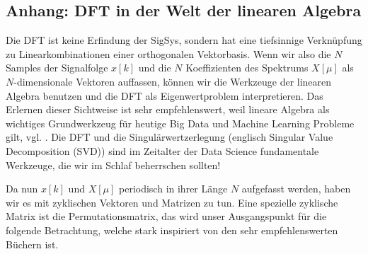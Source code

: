 
















































\clearpage
\subsection*{Anhang: DFT in der Welt der linearen Algebra}
%
Die DFT ist keine Erfindung der SigSys, sondern hat eine
tiefsinnige Verknüpfung zu Linearkombinationen einer orthogonalen
Vektorbasis.
%
Wenn wir also die $N$ Samples der Signalfolge $x[k]$ und die $N$ Koeffizienten des Spektrums $X[\mu]$
als $N$-dimensionale Vektoren auffassen, können wir die Werkzeuge der linearen
Algebra benutzen und die DFT als Eigenwertproblem interpretieren.
%
Das Erlernen dieser Sichtweise ist sehr empfehlenswert,
weil lineare Algebra als wichtiges Grundwerkzeug für heutige
Big Data und Machine Learning Probleme gilt, vgl. \cite{Strang2019}.
%
Die DFT und die Singulärwertzerlegung (englisch
Singular Value Decomposition (SVD)) sind im Zeitalter der Data Science
fundamentale Werkzeuge, die wir im Schlaf beherrschen sollten!
%

Da nun $x[k]$ und $X[\mu]$ periodisch in ihrer Länge $N$ aufgefasst werden,
haben wir es mit zyklischen Vektoren und Matrizen zu tun.
%
Eine spezielle zyklische Matrix ist die Permutationsmatrix, das wird unser
Ausgangspunkt für die folgende Betrachtung, welche stark inspiriert von
den sehr empfehlenswerten Büchern \cite{Strang2016, Strang2019} ist.
%

